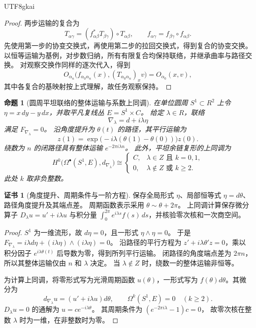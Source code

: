 \documentclass[12pt,a4paper,openany,notitlepage]{report}
\theoremstyle{plain}
\newtheorem{proposition}[theorem]{命题}
\theoremstyle{definition}
\newtheorem*{certificate}{证书}
\theoremstyle{remark}
\def\mathcal#1{#1}\def\mathsf#1{#1}\def\mathbb#1{#1}%
\begin{document}
\begin{CJK*}{UTF8}{gkai}
\begin{proof}
两步运输的复合为
\[
T_{\alpha\gamma}
=(f_{\alpha\beta}^*T_{\beta\gamma})\circ T_{\alpha\beta},
\qquad
f_{\alpha\gamma}=f_{\beta\gamma}\circ f_{\alpha\beta}.
\]
先使用第一步的协变交换式，再使用第二步的拉回交换式，得到复合的协变交换。
以恒等运输为基例，对步数归纳，所有有限复合均保持联络，并继承曲率与路径交换。
对观察交换作同样的逐次代入，得到
\[
\mathcal O_{\alpha_n}\bigl(f_{\alpha_0\alpha_n}(x),
(T_{\alpha_0\alpha_n})_xv\bigr)
=\mathcal O_{\alpha_0}(x,v),
\]
其中各复合的基映射按上式理解，故任务观察保持。
\end{proof}

\begin{proposition}[圆周平坦联络的整体运输与系数上同调]
\label{exp:geo:prop:circle-holonomy}
在单位圆周 $S^1\subset\mathbb R^2$ 上令
$\eta=x\,dy-y\,dx$，并取平凡复线丛 $E=S^1\times\mathbb C$。
给定 $\lambda\in\mathbb R$，联络
\[
\nabla_\lambda=d+i\lambda\eta
\]
满足 $F_{\nabla_\lambda}=0$。
沿角度提升为 $\theta(t)$ 的路径，其平行运输为
\[
z(1)=\exp\bigl(-i\lambda(\theta(1)-\theta(0))\bigr)z(0).
\]
绕数为 $n$ 的闭路径具有整体运输 $e^{-2\pi i\lambda n}$。
此外，平坦余链复形的上同调为
\[
H^k\bigl(\Omega^\bullet(S^1,E),d_{\nabla_\lambda}\bigr)
\cong
\begin{cases}
\mathbb C,&\lambda\in\mathbb Z\text{ 且 }k=0,1,\\
0,&\lambda\notin\mathbb Z\text{ 或 }k\ge2.
\end{cases}
\]
此处 $k$ 取非负整数。
\end{proposition}
\begin{certificate}[角度提升、周期条件与一阶方程]
保存全局形式 $\eta$、局部恒等式 $\eta=d\theta$、路径角度提升及其端点差。
周期函数表示采用 $\theta\sim\theta+2\pi$。
上同调计算保存微分算子
$D_\lambda u=u'+i\lambda u$ 与积分量
$\int_0^{2\pi}e^{i\lambda s}f(s)\,ds$，并核验零次核和一次商空间。
\end{certificate}
\begin{proof}
$S^1$ 为一维流形，故 $d\eta=0$，且一形式 $\eta\wedge\eta=0$。
于是 $F_{\nabla_\lambda}=i\lambda d\eta+(i\lambda\eta)\wedge(i\lambda\eta)=0$。
沿路径的平行方程为 $z'+i\lambda\theta'z=0$，乘以积分因子
$e^{i\lambda\theta(t)}$ 后导数为零，得到所列平行运输。
闭路径的角度端点差为 $2\pi n$，所以其整体运输仅由 $n$ 和 $\lambda$ 决定。
当 $\lambda\notin\mathbb Z$ 时，绕数一的整体运输非恒等。

为计算上同调，将零形式写为光滑周期函数 $u(\theta)$，一形式写为
$f(\theta)d\theta$。其微分为
\[
d_{\nabla_\lambda}u=(u'+i\lambda u)d\theta,
\qquad\Omega^k(S^1,E)=0\quad(k\ge2).
\]
$D_\lambda u=0$ 的通解为 $u=c e^{-i\lambda\theta}$。
其周期条件为 $(e^{-2\pi i\lambda}-1)c=0$，
故零次核在整数 $\lambda$ 时为一维，在非整数时为零。


\end{proof}
\end{CJK*}
\end{document}

